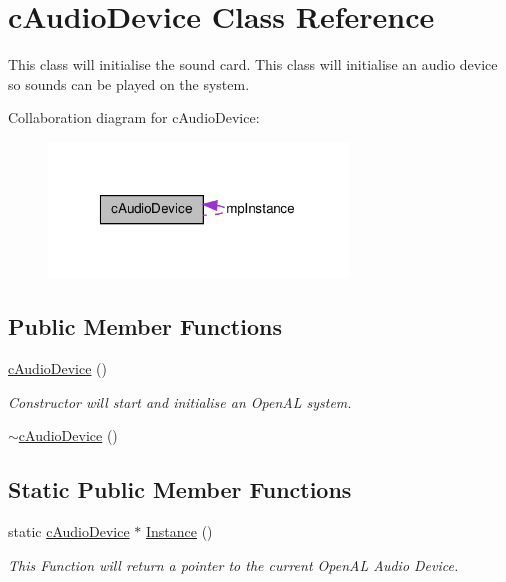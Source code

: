 \hypertarget{classc_audio_device}{
\section{cAudioDevice Class Reference}
\label{classc_audio_device}
}


This class will initialise the sound card. This class will initialise an audio device so sounds can be played on the system.  




Collaboration diagram for cAudioDevice:
\nopagebreak
\begin{figure}[H]
\begin{center}
\leavevmode
\includegraphics[width=226pt]{classc_audio_device__coll__graph}
\end{center}
\end{figure}
\subsection*{Public Member Functions}
\begin{DoxyCompactItemize}
\item 
\hyperlink{classc_audio_device_a66ac901442496247a1e9a9ea7ef44120}{cAudioDevice} ()
\begin{DoxyCompactList}\small\item\em Constructor will start and initialise an OpenAL system. \item\end{DoxyCompactList}\item 
\hyperlink{classc_audio_device_a6cb9d4db387aa459566eac8f4013e168}{$\sim$cAudioDevice} ()
\end{DoxyCompactItemize}
\subsection*{Static Public Member Functions}
\begin{DoxyCompactItemize}
\item 
static \hyperlink{classc_audio_device}{cAudioDevice} $\ast$ \hyperlink{classc_audio_device_a9459868634c2a7340f5eaab9335659cd}{Instance} ()
\begin{DoxyCompactList}\small\item\em This Function will return a pointer to the current OpenAL Audio Device. \item\end{DoxyCompactList}\end{DoxyCompactItemize}


